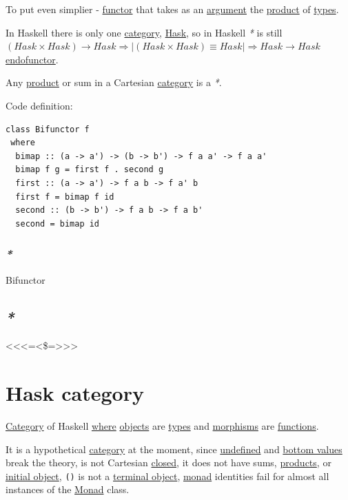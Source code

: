 \documentclass[a4paper,14pt,oneside]{book}
\begin{document}
To put even simplier - \hyperref[orgdd3b6fb]{functor} that takes as an \hyperref[org7be5baf]{argument} the \hyperref[org917411a]{product} of \hyperref[org91cf53a]{types}.

In Haskell there is only one \hyperref[org82baa03]{category}, \hyperref[org9b4a4d9]{Hask}, so in Haskell \emph{*} is still \((Hask \times Hask) \rightarrow Hask \Rightarrow | (Hask \times Hask) \equiv Hask | \Rightarrow Hask \rightarrow Hask\) \hyperref[org986474e]{endofunctor}.

Any \hyperref[org917411a]{product} or sum in a Cartesian \hyperref[org82baa03]{category} is a \emph{*}.

Code definition:
\begin{verbatim}
class Bifunctor f
 where
  bimap :: (a -> a') -> (b -> b') -> f a a' -> f a a'
  bimap f g = first f . second g
  first :: (a -> a') -> f a b -> f a' b
  first f = bimap f id
  second :: (b -> b') -> f a b -> f a b'
  second = bimap id
\end{verbatim}

\subsubsection{\emph{*}}
\label{sec:org2645830}
\label{orga80441c}Bifunctor

\subsection{\emph{*}}
\label{sec:orgf3814bc}

<<<=<\$=>>>

\section{\label{orga995935}Hask category}
\label{sec:orgbdb02e2}
\hyperref[org82baa03]{Category} of Haskell \hyperref[orgbe7070f]{where} \hyperref[org88e24d2]{objects} are \hyperref[org91cf53a]{types} and \hyperref[orgfb70910]{morphisms} are \hyperref[org98c9592]{functions}.

It is a hypothetical \hyperref[org82baa03]{category} at the moment, since \hyperref[org7568204]{undefined} and \hyperref[org7923e7f]{bottom values} break the theory, is not Cartesian \hyperref[org2bfc801]{closed}, it does not have sums, \hyperref[org2b27976]{products}, or \hyperref[org49bdc74]{initial object}, \texttt{()} is not a \hyperref[orgbc0b3c7]{terminal object}, \hyperref[org1b8b304]{monad} identities fail for almost all instances of the \hyperref[org1b8b304]{Monad} class.
\end{document}
